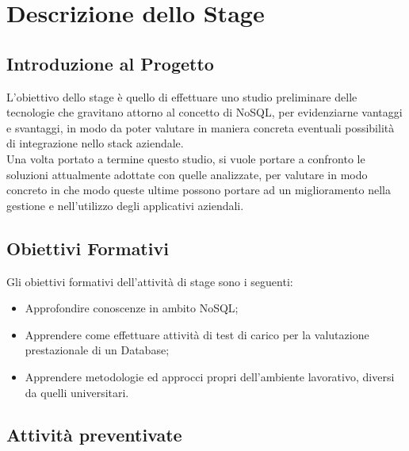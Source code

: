 
\chapter{Descrizione dello Stage}
\label{cap:capitolo2}


\section{Introduzione al Progetto}

L'obiettivo dello stage è quello di effettuare uno studio preliminare delle tecnologie che gravitano attorno al concetto di NoSQL, per evidenziarne vantaggi e svantaggi, in modo da poter valutare in maniera concreta eventuali possibilità di integrazione nello stack aziendale. \\
Una volta portato a termine questo studio, si vuole portare a confronto le soluzioni attualmente adottate con quelle analizzate, per valutare in modo concreto in che modo queste ultime possono portare ad un miglioramento nella gestione e nell'utilizzo degli applicativi aziendali.

\section{Obiettivi Formativi}

Gli obiettivi formativi dell'attività di stage sono i seguenti:
\begin{itemize}
    \item Approfondire conoscenze in ambito NoSQL;
    \item Apprendere come effettuare attività di test di carico per la valutazione prestazionale di un Database;
    \item Apprendere metodologie ed approcci propri dell'ambiente lavorativo, diversi da quelli universitari.
\end{itemize}

\section{Attività preventivate}

